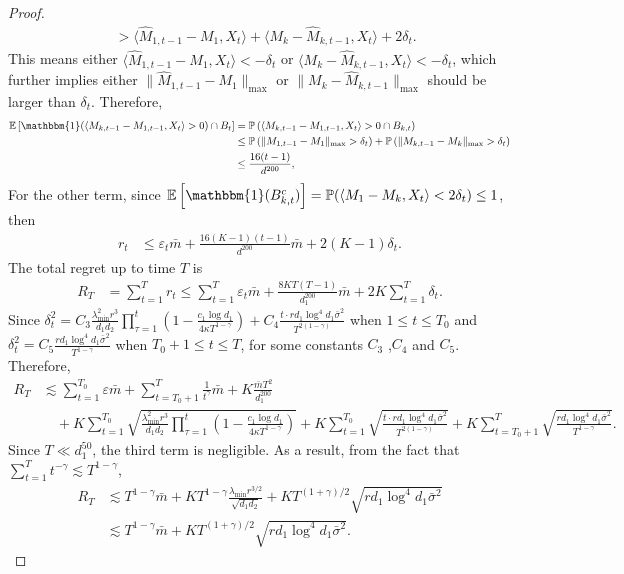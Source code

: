 \documentclass[12pt]{article}
\newcommand{\inp}[2]{\langle #1,#2\rangle}
\newcommand{\PP}{\mathbb{P}}
\def\EE{{\mathbb E}}
\def\PP{{\mathbb P}}
\theoremstyle{plain}
\begin{document}
\begin{proof}
\begin{align*}
    &> \inp{\widehat{M}_{1,t-1}-M_1}{X_t} + \inp{M_k-\widehat{M}_{k,t-1}}{X_t} + 2\delta_t.
\end{align*}
This means either $\inp{\widehat{M}_{1,t-1}-M_1}{X_t}<-\delta_t$ or $\inp{M_k-\widehat{M}_{k,t-1}}{X_t}<-\delta_t$, which further implies either $\|\widehat{M}_{1,t-1}-M_1\|_{\max}$ or $\|M_k-\widehat{M}_{k,t-1}\|_{\max}$ should be larger than $\delta_t$. Therefore, 
\begin{align*}
    \EE\left[\mathbbm{1}(\inp{{M}_{k,t-1}-{M}_{1,t-1}}{X_t}> 0)\cap B_t\right]&= \PP\left(\inp{{M}_{k,t-1}-{M}_{1,t-1}}{X_t}> 0 \cap B_{k,t}\right) \\
    &\leq \PP\left(\|{M}_{1,t-1}-M_1\|_{\max}>\delta_t\right) + \PP\left(\|{M}_{k,t-1}-M_k\|_{\max}>\delta_t\right) \\
    &\leq \frac{16(t-1)}{d^{200}},
\end{align*}
For the other term, since $\EE\left[\mathbbm{1}(B_{k,t}^c)\right]=\PP(\inp{M_1-M_k}{X_t}<2\delta_t)\leq 1$, then
\begin{align*}
    r_t&\leq \varepsilon_t\bar{m} + \frac{16(K-1)(t-1)}{d^{200}}\bar{m}  + 2(K-1)\delta_t. 
\end{align*}
The total regret up to time $T$ is
\begin{align*}
    R_T&=\sum_{t=1}^{T} r_t \leq \sum_{t=1}^T\varepsilon_t \bar{m} + \frac{8KT(T-1)}{d_1^{200}}\bar{m}  + 2K\sum_{t=1}^{T} \delta_t.
\end{align*}
Since $\delta_t^2= C_3\frac{\lambda_{\min}^2r^3}{d_1d_2}  \prod_{\tau=1}^{t}(1-\frac{c_1\log d_1}{4\kappa T^{1-\gamma}}) + C_4\frac{t\cdot rd_1\log^4d_1\bar{\sigma}^2}{T^{2(1-\gamma)}}$ when $1\leq t\leq T_0$ and $\delta_t^2=C_5\frac{rd_1\log^4d_1\bar{\sigma}^2}{T^{1-\gamma}}$ when $T_0+1\leq t\leq T$, for some constants $C_3$ ,$C_4$ and $C_5$. Therefore,
\begin{align*}
    R_T&\lesssim \sum_{t=1}^{T_0}\varepsilon \bar{m} + \sum_{t=T_0 + 1}^{T}\frac{1}{t^\gamma}\bar{m}  + K\frac{\bar{m}T^2}{d_1^{200}} \\ &\quad + K\sum_{t=1}^{T_0} \sqrt{\frac{\lambda_{\min}^2r^3}{d_1d_2}  \prod_{\tau=1}^{t}(1-\frac{c_1\log d_1}{4\kappa T^{1-\gamma}})} + K\sum_{t=1}^{T_0} \sqrt{\frac{t\cdot rd_1\log^4d_1\bar{\sigma}^2}{T^{2(1-\gamma)}}} + K\sum_{t=T_0+1}^{T} \sqrt{\frac{rd_1\log^4d_1\bar{\sigma}^2}{T^{1-\gamma}}}.
\end{align*}
Since $T\ll d_1^{50}$, the third term is negligible. As a result, from the fact that $\sum_{t=1}^T t^{-\gamma}\lesssim T^{1-\gamma}$,
\begin{align*}
    R_T&\lesssim T^{1-\gamma}\bar{m} + KT^{1-\gamma}\frac{\lambda_{\min}r^{3/2}}{\sqrt{d_1d_2}}  + KT^{(1+\gamma)/2}\sqrt{rd_1\log^4d_1\bar{\sigma}^2} \\
    &\lesssim T^{1-\gamma}\bar{m} + KT^{(1+\gamma)/2}\sqrt{rd_1\log^4d_1\bar{\sigma}^2}.
\end{align*}
\end{proof}
\end{document}
